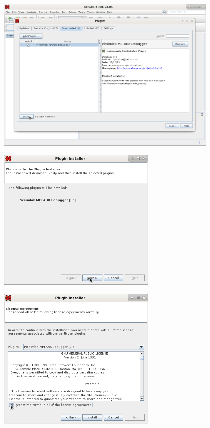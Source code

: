 \begin{figure}[H]
\center
\includegraphics[width=0.98\textwidth]{img/hmd/mplab05.png} 
\end{figure} 


\begin{figure}[H]
\center
\includegraphics[width=0.7\textwidth]{img/hmd/mplab06.png} 
\end{figure} 

\begin{figure}[H]
\center
\includegraphics[width=0.7\textwidth]{img/hmd/mplab07.png} 
\end{figure} 

